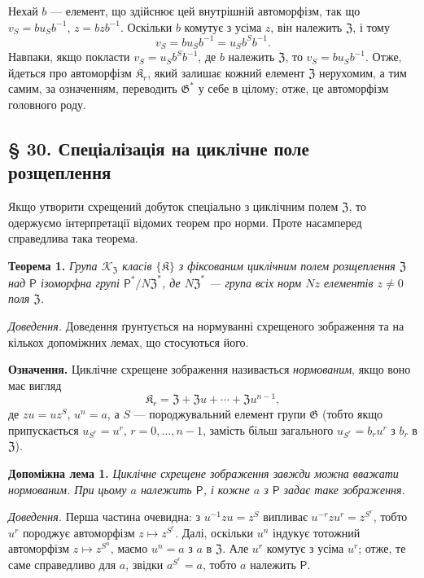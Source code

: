 \documentclass[11pt]{article}
\begin{document}
Нехай \(b\) --- елемент, що здійснює цей внутрішній автоморфізм, так що \(v_S=bu_Sb^{-1}\), \(z=bzb^{-1}\). Оскільки \(b\) комутує з усіма \(z\), він належить \(\mathfrak Z\), і тому
\[
v_S=bu_Sb^{-1}=u_Sb^Sb^{-1}.
\]
Навпаки, якщо покласти \(v_S=u_Sb^Sb^{-1}\), де \(b\) належить \(\mathfrak Z\), то \(v_S=bu_Sb^{-1}\). Отже, йдеться про автоморфізм \(\mathfrak K_r\), який залишає кожний елемент \(\mathfrak Z\) нерухомим, а тим самим, за означенням, переводить \(\mathfrak G^*\) у себе в цілому; отже, це автоморфізм головного роду.

\subsection*{§ 30. Спеціалізація на циклічне поле розщеплення}\label{spezialisierung-auf-zyklische-zerfaellungskoerper}

Якщо утворити схрещений добуток спеціально з циклічним полем \(\mathfrak Z\), то одержуємо інтерпретації відомих теорем про норми. Проте насамперед справедлива така теорема.

\noindent\textbf{Теорема 1.} \emph{Група \(\mathscr K_{\mathfrak Z}\) класів \(\{\mathfrak K\}\) з фіксованим циклічним полем розщеплення \(\mathfrak Z\) над \(\mathsf{P}\) ізоморфна групі \(\mathsf{P}^*/N\mathfrak Z^*\), де \(N\mathfrak Z^*\) --- група всіх норм \(Nz\) елементів \(z\neq0\) поля \(\mathfrak Z\).}

\noindent\emph{Доведення.} Доведення ґрунтується на нормуванні схрещеного зображення та на кількох допоміжних лемах, що стосуються його.

\noindent\textbf{Означення.} Циклічне схрещене зображення називається \emph{нормованим}, якщо воно має вигляд
\[
\mathfrak K_r=\mathfrak Z+\mathfrak Zu+\cdots+\mathfrak Zu^{n-1},
\]
де \(zu=uz^S\), \(u^n=a\), а \(S\) --- породжувальний елемент групи \(\mathfrak G\) (тобто якщо припускається \(u_{S^r}=u^r\), \(r=0,\ldots,n-1\), замість більш загального \(u_{S^r}=b_ru^r\) з \(b_r\) в \(\mathfrak Z\)).

\noindent\textbf{Допоміжна лема 1.} \emph{Циклічне схрещене зображення завжди можна вважати нормованим. При цьому \(a\) належить \(\mathsf{P}\), і кожне \(a\) з \(\mathsf{P}\) задає таке зображення.}

\noindent\emph{Доведення.} Перша частина очевидна: з \(u^{-1}zu=z^S\) випливає \(u^{-r}zu^r=z^{S^r}\), тобто \(u^r\) породжує автоморфізм \(z\mapsto z^{S^r}\). Далі, оскільки \(u^n\) індукує тотожний автоморфізм \(z\mapsto z^{S^n}\), маємо \(u^n=a\) з \(a\) в \(\mathfrak Z\). Але \(u^r\) комутує з усіма \(u^r\); отже, те саме справедливо для \(a\), звідки \(a^{S^r}=a\), тобто \(a\) належить \(\mathsf{P}\).
\end{document}
